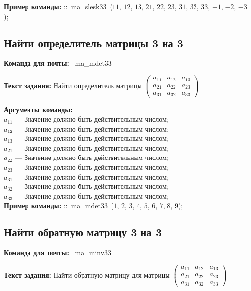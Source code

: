 \noindent \textbf{Пример команды:} ::\mbox{ ma\_slesk33 }($11$, $12$, $13$, $21$, $22$, $23$, $31$, $32$, $33$, $-1$, $-2$, $-3$);

\subsection{Найти определитель матрицы 3 на 3}

\noindent \textbf{Команда для почты:} \mbox{ ma\_mdet33 }

\noindent \textbf{Текст задания:} Найти определитель матрицы $\begin{pmatrix} a_{11} & a_{12} & a_{13} \\ a_{21} & a_{22} & a_{23} \\ a_{31} & a_{32} & a_{33} \end{pmatrix}$

\noindent \textbf{Аргументы команды:}\\ $a_{11}$ ---  Значение должно быть действительным числом;\\
$a_{12}$ ---  Значение должно быть действительным числом;\\
$a_{13}$ ---  Значение должно быть действительным числом;\\
$a_{21}$ ---  Значение должно быть действительным числом;\\
$a_{22}$ ---  Значение должно быть действительным числом;\\
$a_{23}$ ---  Значение должно быть действительным числом;\\
$a_{31}$ ---  Значение должно быть действительным числом;\\
$a_{32}$ ---  Значение должно быть действительным числом;\\
$a_{33}$ ---  Значение должно быть действительным числом;\\
 

\noindent \textbf{Пример команды:} ::\mbox{ ma\_mdet33 }($1$, $2$, $3$, $4$, $5$, $6$, $7$, $8$, $9$);

\subsection{Найти обратную матрицу 3 на 3}

\noindent \textbf{Команда для почты:} \mbox{ ma\_minv33 }

\noindent \textbf{Текст задания:} Найти обратную матрицу для матрицы $\begin{pmatrix} a_{11} & a_{12} & a_{13} \\ a_{21} & a_{22} & a_{23} \\ a_{31} & a_{32} & a_{33} \end{pmatrix}$

